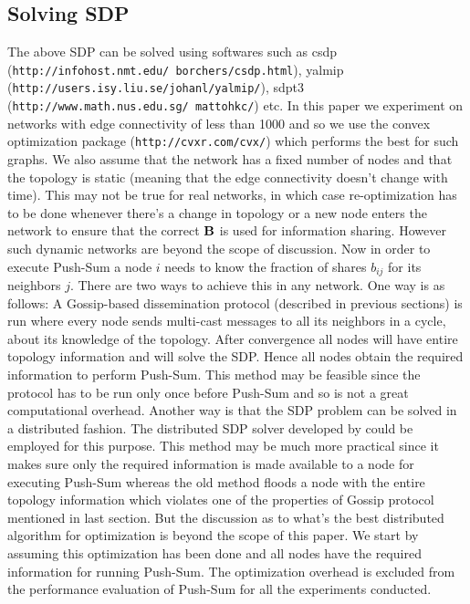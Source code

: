 \documentclass{article}
\begin{document}
\subsection{Solving SDP}
The above SDP can be solved using softwares such as csdp (\texttt{http://infohost.nmt.edu/~borchers/csdp.html}), yalmip (\texttt{http://users.isy.liu.se/johanl/yalmip/}), sdpt3 (\texttt{http://www.math.nus.edu.sg/~mattohkc/}) etc. In this paper we experiment on networks with edge connectivity of less than 1000 and so we use the convex optimization package (\texttt{http://cvxr.com/cvx/}) which performs the best for such graphs. We also assume that the network has a fixed number of nodes and that the topology is static (meaning that the edge connectivity doesn't change with time). This may not be true for real networks, in which case re-optimization has to be done whenever there's a change in topology or a new node enters the network to ensure that the correct $\bf{B}$ is used for information sharing. However such dynamic networks are beyond the scope of discussion. Now in order to execute Push-Sum a node $i$ needs to know the fraction of shares $b_{ij}$ for its neighbors $j$. There are two ways to achieve this in any network. One way is as follows: A Gossip-based dissemination protocol (described in previous sections) is run where every node sends multi-cast messages to all its neighbors in a cycle, about its knowledge of the topology. After convergence all nodes will have entire topology information and will solve the SDP. Hence all nodes obtain  the required information to perform Push-Sum. This method may be feasible since the protocol has to be run only once before Push-Sum and so is not a great computational overhead. Another way is that the SDP problem can be solved in a distributed fashion. The distributed SDP solver developed by \cite{biswas2006distributed} could be employed for this purpose. This method may be much more practical since it makes sure only the required information is made available to a node for executing Push-Sum whereas the old method floods a node with the entire topology information which violates one of the properties of Gossip protocol mentioned in last section. But the discussion as to what's the best distributed algorithm for optimization is beyond the scope of this paper. We start by assuming this optimization has been done and all nodes have the required information for running Push-Sum. The optimization overhead is excluded from the performance evaluation of Push-Sum for all the experiments conducted.
\end{document}
